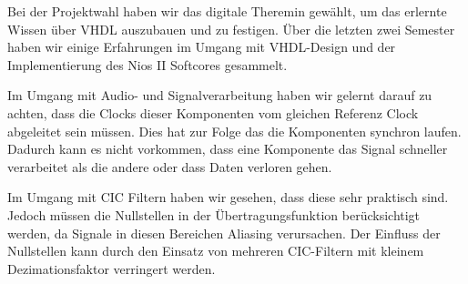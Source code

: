 Bei der Projektwahl haben wir das digitale Theremin gewählt, um das erlernte Wissen über VHDL auszubauen und zu festigen. Über die letzten zwei Semester haben wir einige Erfahrungen im Umgang mit VHDL-Design und der Implementierung des Nios II Softcores gesammelt.

Im Umgang mit Audio- und Signalverarbeitung haben wir gelernt darauf zu achten, dass die Clocks dieser Komponenten vom gleichen Referenz Clock abgeleitet sein müssen. Dies hat zur Folge das die Komponenten synchron laufen. Dadurch kann es nicht vorkommen, dass eine Komponente das Signal schneller verarbeitet als die andere oder dass Daten verloren gehen. 

Im Umgang mit CIC Filtern haben wir gesehen, dass diese sehr praktisch sind. Jedoch müssen die Nullstellen in der Übertragungsfunktion berücksichtigt werden, da Signale in diesen Bereichen Aliasing verursachen. Der Einfluss der Nullstellen kann durch den Einsatz von mehreren CIC-Filtern mit kleinem Dezimationsfaktor verringert werden.

